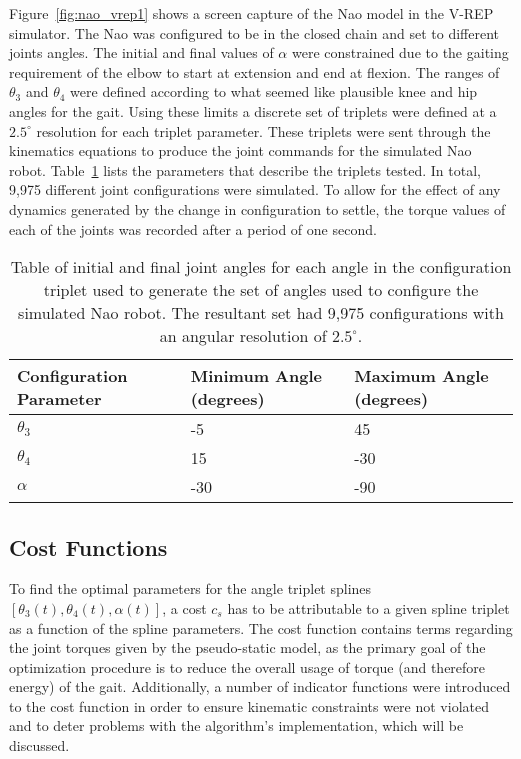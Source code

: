 Figure~\ref{fig:nao_vrep1} shows a screen capture of the Nao model in the V-REP simulator. 
The Nao was configured to be in the closed chain and set to different joints angles. 
The initial and final values of $\alpha$ were constrained due to the gaiting requirement of the elbow to start at 
extension and end at flexion. The ranges of $\theta_3$ and $\theta_4$ were defined according to what seemed
like plausible knee and hip angles for the gait. Using these limits a discrete set of triplets were defined
at a $2.5^\circ$ resolution for each triplet parameter. These triplets were sent through the kinematics equations to produce the joint
commands for the simulated Nao robot. 
Table~\ref{tab:angle_set_params1} lists the parameters that describe the triplets tested. In total, 9,975
different joint configurations were simulated.
To allow for the effect of
any dynamics generated by the change in configuration to settle, the torque values of each of the joints was recorded
after a period of one second.

\begin{table}
	\centering
	\begin{tabularx}{0.65 \textwidth}{|X||X|X|}
		\hline
		\textbf{Configuration Parameter} 	&	\textbf{Minimum Angle (degrees)} 		&	\textbf{Maximum Angle (degrees)} 	\\	\hline\hline
		$\theta_3$ 	  & 	-5   &	 45 	\\	\hline
		$\theta_4$		&	  15	 &	-30	  \\ 	\hline
		$\alpha$			&  -30	 &	-90		\\ 	\hline
	\end{tabularx} 
	
	\caption{Table of initial and final joint angles for each angle in the configuration triplet used to generate the set of
				angles used to configure the simulated Nao robot.
				The resultant set had 9,975 configurations with an angular resolution of $2.5^\circ$.}
	\label{tab:angle_set_params1}
\end{table}

\subsection{Cost Functions} \label{subsec:cost_functions}

To find the optimal parameters for the angle triplet splines $[\theta_3(t), \theta_4(t), \alpha(t)]$, 
a cost $c_s$ has to be attributable to a given spline triplet as a function of the spline parameters.
The cost function contains terms regarding the joint torques given by the pseudo-static model, as
the primary goal of the optimization procedure is to reduce the overall usage of torque
(and therefore energy) of the gait. Additionally, a number of indicator functions
were introduced to the cost function in order to ensure kinematic constraints were not violated
and to deter problems with the algorithm's implementation, which will be discussed.

